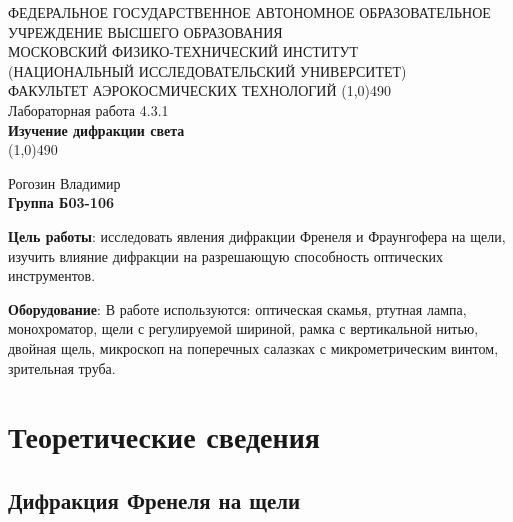 \documentclass[a4paper,12pt]{article}
\begin{document}
\begin{titlepage}
\begin{center}
\large{\small ФЕДЕРАЛЬНОЕ ГОСУДАРСТВЕННОЕ АВТОНОМНОЕ ОБРАЗОВАТЕЛЬНОЕ\\ УЧРЕЖДЕНИЕ ВЫСШЕГО ОБРАЗОВАНИЯ \\ МОСКОВСКИЙ ФИЗИКО-ТЕХНИЧЕСКИЙ ИНСТИТУТ\\ (НАЦИОНАЛЬНЫЙ ИССЛЕДОВАТЕЛЬСКИЙ УНИВЕРСИТЕТ)\\ ФАКУЛЬТЕТ АЭРОКОСМИЧЕСКИХ ТЕХНОЛОГИЙ}
\vfill
\line(1,0){490}\\[1mm]
\huge{Лабораторная работа 4.3.1}\\
\huge\textbf{Изучение дифракции света}\\
\line(1,0){490}\\[1mm]
\vfill
\begin{flushright}
\normalsize{Рогозин Владимир}\\
\normalsize{\textbf{Группа Б03-106}}\\
\end{flushright}
\end{center}
\end{titlepage}

\textbf{Цель работы}:
исследовать явления дифракции Френеля и Фраунгофера на щели, изучить влияние дифракции на разрешающую способность оптических инструментов.


\textbf{Оборудование}:
В работе используются: оптическая скамья, ртутная лампа, монохроматор, щели с регулируемой шириной, рамка с вертикальной нитью, двойная щель, микроскоп на поперечных салазках с микрометрическим винтом, зрительная труба.

\section{Теоретические сведения}
\subsection{Дифракция Френеля на щели}
\end{document}
